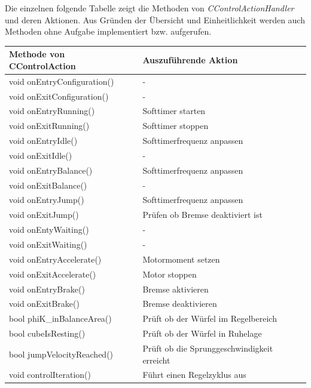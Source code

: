 \documentclass{article}
\begin{document}
\newpage
Die einzelnen folgende Tabelle zeigt die Methoden von \textit{CControlActionHandler} und deren Aktionen. Aus Gründen der Übersicht und Einheitlichkeit werden auch Methoden ohne Aufgabe implementiert bzw. aufgerufen.
\begin{table}[h]
\centering
\label{my-label}
\begin{tabular}{|l|l|}
\hline
\textbf{Methode von CControlAction} & \textbf{Auszuführende Aktion}               \\ \hline
void onEntryConfiguration()         & -                                           \\ \hline
void onExitConfiguration()          & -                                           \\ \hline
void onEntryRunning()               & Softtimer starten                           \\ \hline
void onExitRunning()                & Softtimer stoppen                           \\ \hline
void onEntryIdle()                  & Softtimerfrequenz anpassen                  \\ \hline
void onExitIdle()                   & -                                           \\ \hline
void onEntryBalance()               & Softtimerfrequenz anpassen                  \\ \hline
void onExitBalance()                & -                                           \\ \hline
void onEntryJump()                  & Softtimerfrequenz anpassen                  \\ \hline
void onExitJump()                   & Prüfen ob Bremse deaktiviert ist            \\ \hline
void onEntyWaiting()                & -                                           \\ \hline
void onExitWaiting()                & -                                           \\ \hline
void onEntryAccelerate()            & Motormoment setzen                          \\ \hline
void onExitAccelerate()             & Motor stoppen                               \\ \hline
void onEntryBrake()                 & Bremse aktivieren                           \\ \hline
void onExitBrake()                  & Bremse deaktivieren                         \\ \hline
bool phiK\_inBalanceArea()          & Prüft ob der Würfel im Regelbereich         \\ \hline
bool cubeIsResting()                & Prüft ob der Würfel in Ruhelage             \\ \hline
bool jumpVelocityReached()          & Prüft ob die Sprunggeschwindigkeit erreicht \\ \hline
void controlIteration()             & Führt einen Regelzyklus aus                 \\ \hline
\end{tabular}
\end{table}
\end{document}

